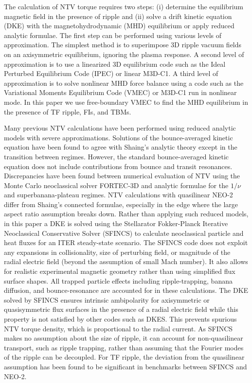 \documentclass[aip, pop, preprint]{revtex4-1}
\numberwithin{figure}{section}
\numberwithin{equation}{section}
\begin{document}
The calculation of NTV torque requires two steps: (i) determine the equilibrium magnetic field in the presence of ripple and (ii) solve a drift kinetic equation (DKE) with the magnetohydrodynamic (MHD) equilibrium or apply reduced analytic formulae. The first step can be performed using various levels of approximation. The simplest method is to superimpose 3D ripple vacuum fields on an axisymmetric equilibrium, ignoring the plasma response.  A second level of approximation is to use a linearized 3D equilibrium code such as the Ideal Perturbed Equilibrium Code (IPEC) \cite{Park2009} or linear M3D-C1.\cite{Jardin2008} A third level of approximation is to solve nonlinear MHD force balance using a code such as the Variational Moments Equilibrium Code (VMEC) \cite{Hirshman1986a} or M3D-C1 \cite{Ferraro2010} run in nonlinear mode. In this paper we use free-boundary VMEC to find the MHD equilibrium in the presence of TF ripple, FIs, and TBMs. 

Many previous NTV calculations \cite{Zhu2006,Hua2010,Cole2011,Park2009} have been performed using reduced analytic models with severe approximations. Solutions of the bounce-averaged kinetic equation have been found to agree with Shaing's analytic theory except in the transition between regimes.\cite{Sun2010} However, the standard bounce-averaged kinetic equation does not include contributions from bounce and transit resonances. Discrepancies have been found between numerical evaluation of NTV using the Monte Carlo neoclassical solver FORTEC-3D and analytic formulae for the $1/\nu$ and superbanana-plateau regimes.\cite{Satake2011a,Satake2011b} NTV calculations with quasilinear NEO-2 differ from Shaing's connected formulae,\cite{Shaing2010} especially in the edge where the large aspect ratio assumption breaks down.\cite{Martitsch2016} Rather than applying such reduced models, in this paper a DKE is solved using the Stellarator Fokker-Planck Iterative Neoclassical Conservative Solver (SFINCS) \cite{Landreman2014} to calculate neoclassical particle and heat fluxes for an ITER steady-state scenario. The SFINCS code does not exploit any expansions in collisionality, size of perturbing field, or magnitude of the radial electric field (beyond the assumption of small Mach number). It also allows for realistic experimental magnetic geometry rather than using simplified flux surface shapes. All trapped particle effects including ripple-trapping,\cite{Stringer1972} banana diffusion,\cite{Linsker1982} and bounce-resonance\cite{Linsker1982} are accounted for in these calculations. The DKE solved by SFINCS ensures intrinsic ambipolarity for axisymmetric or quasisymmetric flux surfaces in the presence of a radial electric field while this property is not satisfied by other codes such as DKES.\cite{Hirshman1986b,Rij1989} This prevents spurious NTV torque density, which is proportional to the radial current. As SFINCS makes no assumption about the size of ripple, it can account for non-quasilinear transport, such as ripple trapping, rather than assuming that the Fourier modes of the ripple can be decoupled. For TF ripple, the deviation from the quasilinear assumption has been found to be significant in benchmarks between SFINCS and NEO-2.\cite{Martitsch2016}
\end{document}
